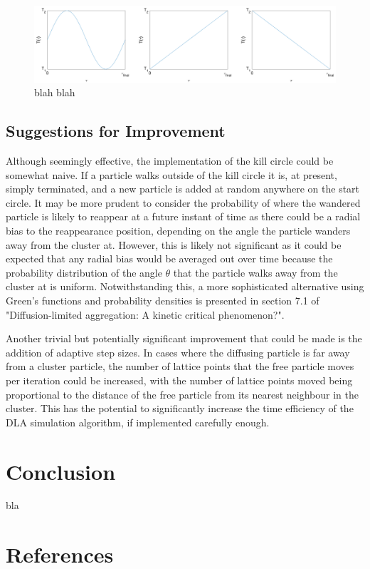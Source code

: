 \documentclass[11pt]{iopart}
\begin{document}
\begin{figure}[t]
  \centering
  \includegraphics[width=\linewidth]{images/temps.png}
  \caption{blah blah}
  \label{fig:temps}
\end{figure}

\subsection{Suggestions for Improvement}
Although seemingly effective, the implementation of the kill circle could be somewhat naive. If a particle walks outside of the kill circle it is, at present, simply terminated, and a new particle is added at random anywhere on the start circle. It may be more prudent to consider the probability of where the wandered particle is likely to reappear at a future instant of time as there could be a radial bias to the reappearance position, depending on the angle the particle wanders away from the cluster at. However, this is likely not significant as it could be expected that any radial bias would be averaged out over time because the probability distribution of the angle $\theta$ that the particle walks away from the cluster at is uniform.  Notwithstanding this, a more sophisticated alternative using Green's functions and probability densities is presented in section 7.1 of "Diffusion-limited aggregation: A kinetic critical phenomenon?"\cite{dla2}. 

Another trivial but potentially significant improvement that could be made is the addition of adaptive step sizes. In cases where the diffusing particle is far away from a cluster particle, the number of lattice points that the free particle moves per iteration could be increased, with the number of lattice points moved being proportional to the distance of the free particle from its nearest neighbour in the cluster. This has the potential to significantly increase the time efficiency of the DLA simulation algorithm, if implemented carefully enough.

\section{Conclusion}
bla

\section*{References}


\end{document}
